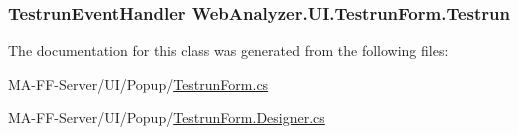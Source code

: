 \subsubsection[{Testrun}]{\setlength{\rightskip}{0pt plus 5cm}Testrun\+Event\+Handler Web\+Analyzer.\+U\+I.\+Testrun\+Form.\+Testrun}\label{class_web_analyzer_1_1_u_i_1_1_testrun_form_ac07b8e3d6b66e219b067dcacd1535f2c}


The documentation for this class was generated from the following files\+:\begin{DoxyCompactItemize}
\item 
M\+A-\/\+F\+F-\/\+Server/\+U\+I/\+Popup/\hyperlink{_testrun_form_8cs}{Testrun\+Form.\+cs}\item 
M\+A-\/\+F\+F-\/\+Server/\+U\+I/\+Popup/\hyperlink{_testrun_form_8_designer_8cs}{Testrun\+Form.\+Designer.\+cs}\end{DoxyCompactItemize}
